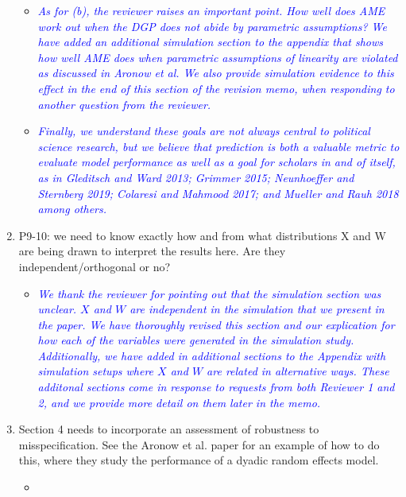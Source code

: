 \begin{enumerate}
\begin{itemize}
		\item \textcolor{blue}{ \emph{
			As for (b), the reviewer raises an important point. How well does AME work out when the DGP does not abide by parametric assumptions? We have added an additional simulation section to the appendix that shows how well AME does when parametric assumptions of linearity are violated as discussed in Aronow et al. We also provide simulation evidence to this effect in the end of this section of the revision memo, when responding to another question from the reviewer. }}
		\item \textcolor{blue}{ \emph{
			Finally, we understand these goals are not always central to political science research, but we believe that prediction is both a valuable metric to evaluate model performance as well as a goal for scholars in and of itself, as in Gleditsch and Ward 2013; Grimmer 2015; Neunhoeffer and Sternberg 2019; Colaresi and Mahmood 2017; and Mueller and Rauh 2018 among others. }}
	\end{itemize}
	\item P9-10: we need to know exactly how and from what distributions X and W are being drawn to interpret the results here.  Are they independent/orthogonal or no?
	\begin{itemize}
		\item \textcolor{blue}{ \emph{
		We thank the reviewer for pointing out that the simulation section was unclear. $X$ and $W$ are independent in the simulation that we present in the paper. We have thoroughly revised this section and our explication for how each of the variables were generated in the simulation study. Additionally, we have added in additional sections to the Appendix with simulation setups where $X$ and $W$ are related in alternative ways. These additonal sections come in response to requests from both Reviewer 1 and 2, and we provide more detail on them later in the memo.
		}}
	\end{itemize}
	\item Section 4 needs to incorporate an assessment of robustness to misspecification.  See the Aronow et al. paper for an example of how to do this, where they study the performance of a dyadic random effects model.
	\begin{itemize}
		\item \textcolor{blue}{ \emph{
}}
\end{itemize}
\end{enumerate}

